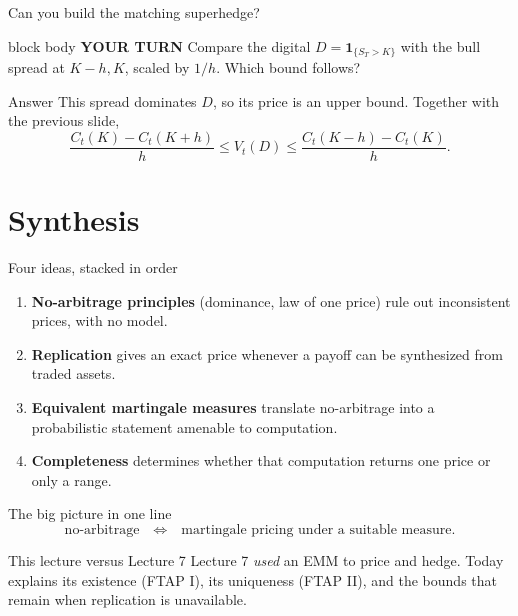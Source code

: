 \documentclass[handout,10pt,aspectratio=169]{beamer}
\newenvironment{pausebox}{\begin{beamercolorbox}[rounded=true,sep=0.8em,wd=\textwidth]{block body}
  \textbf{\color{CourseGold}YOUR TURN}\quad}{\end{beamercolorbox}}
\newcommand{\1}{\mathbf 1}
\begin{document}
\begin{frame}{Can you build the matching superhedge?}
\begin{pausebox}
Compare the digital \(D=\1_{\{S_T>K\}}\) with the bull spread at
\(K-h,K\), scaled by \(1/h\). Which bound follows?
\end{pausebox}

\begin{exampleblock}{Answer}
This spread dominates \(D\), so its price is an upper bound. Together with
the previous slide,
\[
\boxed{\frac{C_t(K)-C_t(K+h)}{h}
\leq V_t(D)\leq
\frac{C_t(K-h)-C_t(K)}{h}.}
\]
\end{exampleblock}
\end{frame}



\section{Synthesis}

\begin{frame}{Four ideas, stacked in order}
\begin{enumerate}
  \item \textbf{No-arbitrage principles} (dominance, law of one price) rule
        out inconsistent prices, with no model.
  \item \textbf{Replication} gives an exact price whenever a payoff can be
        synthesized from traded assets.
  \item \textbf{Equivalent martingale measures} translate no-arbitrage into a
        probabilistic statement amenable to computation.
  \item \textbf{Completeness} determines whether that computation returns one
        price or only a range.
\end{enumerate}
\end{frame}

\begin{frame}{The big picture in one line}
\[
\boxed{
\text{no-arbitrage}
\quad\Longleftrightarrow\quad
\text{martingale pricing under a suitable measure.}}
\]
\begin{block}{This lecture versus Lecture 7}
Lecture 7 \emph{used} an EMM to price and hedge. Today explains its existence
(FTAP I), its uniqueness (FTAP II), and the bounds that remain when
replication is unavailable.
\end{block}
\end{frame}
\end{document}
